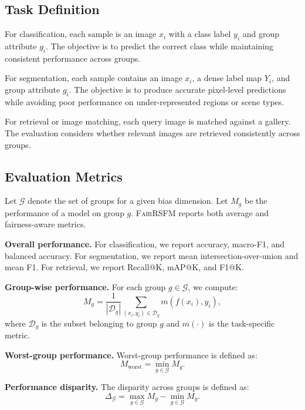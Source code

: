 \documentclass[10pt,twocolumn,letterpaper]{article}
\newcommand{\method}{\textsc{FairRSFM}\xspace}
\begin{document}
\subsection{Task Definition}

For classification, each sample is an image $x_i$ with a class label $y_i$ and group attribute $g_i$. The objective is to predict the correct class while maintaining consistent performance across groups.

For segmentation, each sample contains an image $x_i$, a dense label map $Y_i$, and group attribute $g_i$. The objective is to produce accurate pixel-level predictions while avoiding poor performance on under-represented regions or scene types.

For retrieval or image matching, each query image is matched against a gallery. The evaluation considers whether relevant images are retrieved consistently across groups. 

\subsection{Evaluation Metrics}

Let $\mathcal{G}$ denote the set of groups for a given bias dimension. Let $M_g$ be the performance of a model on group $g$. \method reports both average and fairness-aware metrics.

\textbf{Overall performance.}
For classification, we report accuracy, macro-F1, and balanced accuracy. For segmentation, we report mean intersection-over-union and mean F1. For retrieval, we report Recall@K, mAP@K, and F1@K.

\textbf{Group-wise performance.}
For each group $g \in \mathcal{G}$, we compute:
\begin{equation}
M_g = \frac{1}{|\mathcal{D}_g|} \sum_{(x_i,y_i)\in \mathcal{D}_g} m(f(x_i),y_i),
\end{equation}
where $\mathcal{D}_g$ is the subset belonging to group $g$ and $m(\cdot)$ is the task-specific metric.

\textbf{Worst-group performance.}
Worst-group performance is defined as:
\begin{equation}
M_{\text{worst}} = \min_{g \in \mathcal{G}} M_g.
\end{equation}

\textbf{Performance disparity.}
The disparity across groups is defined as:
\begin{equation}
\Delta_{\mathcal{G}} = \max_{g \in \mathcal{G}} M_g - \min_{g \in \mathcal{G}} M_g.
\end{equation}
\end{document}
